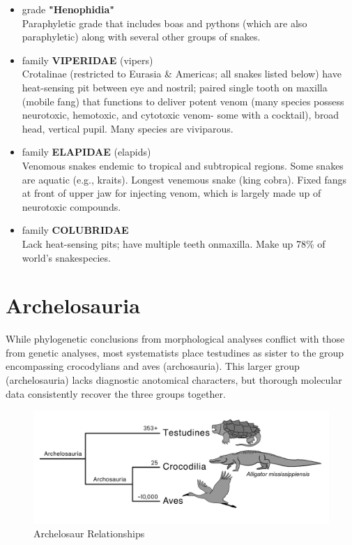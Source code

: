 \documentclass[a4paper,12pt]{article}
\begin{document}
\begin{description}
\begin{itemize}
\begin{itemize}
    \item grade {\textbf{"Henophidia"}} \\ Paraphyletic grade that includes boas and pythons (which are also paraphyletic) along with several other groups of snakes.
    \item family {\textbf{VIPERIDAE}} (vipers) \\ Crotalinae (restricted to Eurasia \& Americas; all snakes listed below) have heat-sensing pit between eye and nostril; paired single tooth on maxilla (mobile fang) that functions to deliver potent venom (many species possess neurotoxic, hemotoxic, and cytotoxic venom- some with a cocktail), broad head, vertical pupil. Many species are viviparous.
    \item family {\textbf{ELAPIDAE}} (elapids) \\ Venomous snakes endemic to tropical and subtropical regions. Some snakes are aquatic (e.g., kraits). Longest venemous snake (king cobra). Fixed fangs at front of upper jaw for injecting venom, which is largely made up of neurotoxic compounds.
    \item family {\textbf{COLUBRIDAE}} \\ Lack heat-sensing pits; have multiple teeth onmaxilla. Make up 78\% of world’s snakespecies.

  \end{itemize}

  
\end{itemize}
\end{description}

\pagebreak

\section{Archelosauria}
While phylogenetic conclusions from morphological analyses conflict with those from genetic analyses, most systematists place testudines as sister to the group encompassing crocodylians and aves (archosauria). This larger group (archelosauria) lacks diagnostic anotomical characters, but thorough molecular data consistently recover the three groups together.

\begin{figure}[H]
\centering
  \includegraphics[scale=0.3]{Archelosauria_tre.pdf}
  \caption{Archelosaur Relationships}
  \label{fig:Archelosauria}
\end{figure}
\end{document}
